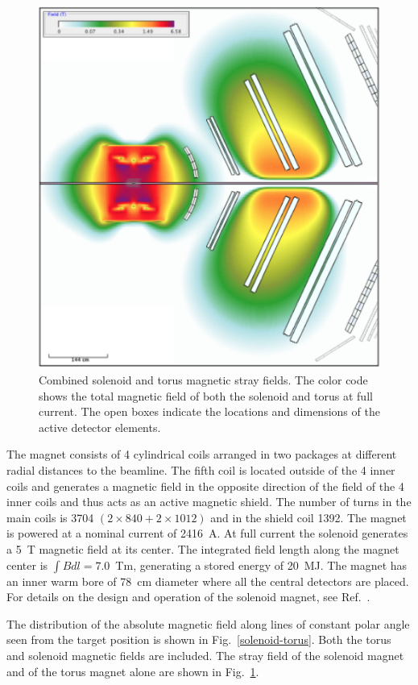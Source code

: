 \documentclass[final,3p,twocolumn]{elsarticle}
\begin{document}
\begin{figure}[htbp!]
\centerline{\includegraphics[width=0.95\columnwidth]{magfield-2.png}}
\caption{Combined solenoid and torus magnetic stray fields. The color code shows the total magnetic field of both
  the solenoid and torus at full current. The open boxes indicate the locations and dimensions of the active detector
  elements.}
\label{stray-field}
\end{figure}

The magnet consists of 4 cylindrical coils arranged in two packages at different radial distances to the beamline.
The fifth coil is located outside of the 4 inner coils and generates a magnetic field in the opposite direction of the
field of the 4 inner coils and thus acts as an active magnetic shield. The number of turns in the main coils is 3704
$(2 \times 840 + 2 \times 1012)$ and in the shield coil 1392. The magnet is powered at a nominal current of
2416~A. At full current the solenoid generates a 5~T magnetic field at its center. The integrated field length along
the magnet center is $\int Bdl = 7.0$~Tm, generating a stored energy of 20~MJ. The magnet has an inner warm bore
of 78~cm diameter where all the central detectors are placed.  For details on the design and operation of the
solenoid magnet, see Ref.~\cite{clas12-magnets}.

The distribution of the absolute magnetic field along lines of constant polar angle seen from the target position is
shown in Fig.~\ref{solenoid-torus}. Both the torus and solenoid magnetic fields are included. The stray field of the
solenoid magnet and of the torus magnet alone are shown in Fig.~\ref{stray-field}.  
\end{document}
